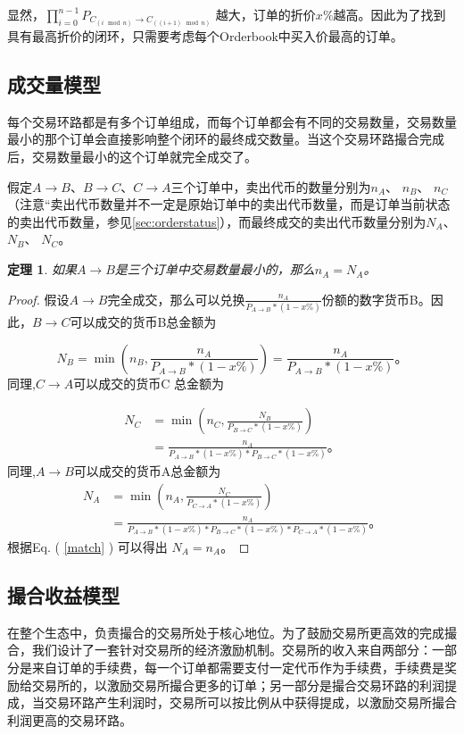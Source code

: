 \documentclass[UTF8,nofonts]{ctexart}
\newtheorem{theorem}{定理}[section]
\newtheorem{proof}{证明} [section]
\begin{document}
显然，$\prod_{i=0}^{n-1} P_{C_{(i\mod n)} \rightarrow C_{((i+1)\mod n)}}$ 越大，订单的折价$x\%$越高。因此为了找到具有最高折价的闭环，只需要考虑每个Orderbook中买入价最高的订单。


\subsection{成交量模型}
每个交易环路都是有多个订单组成，而每个订单都会有不同的交易数量，交易数量最小的那个订单会直接影响整个闭环的最终成交数量。当这个交易环路撮合完成后，交易数量最小的这个订单就完全成交了。

假定$A \rightarrow B$、$B \rightarrow C$、$C \rightarrow A$三个订单中，卖出代币的数量分别为$n_{A}$、 $n_{B}$、 $n_{C}$（注意“卖出代币数量并不一定是原始订单中的卖出代币数量，而是订单当前状态的卖出代币数量，参见\ref{sec:orderstatus}），而最终成交的卖出代币数量分别为$N_{A}$、 $N_{B}$、 $N_{C}$。

\begin{theorem}
如果$A \rightarrow B$是三个订单中交易数量最小的，那么$n_{A} = N_{A}$。
\end{theorem}

\begin{proof}
假设$A \rightarrow B$完全成交，那么可以兑换$\frac{n_{A}}{P_{A \rightarrow B}*(1-x\%)}$份额的数字货币B。因此，$B \rightarrow C$可以成交的货币B总金额为

$$N_{B}=\min(n_{B},\frac{n_{A}}{P_{A \rightarrow B}*(1-x\%)})=\frac{n_{A}}{P_{A \rightarrow B}*(1-x\%)}\text{。}$$
同理,$C \rightarrow A$可以成交的货币C 总金额为

\[ \begin{split}
N_{C}&=\min(n_{C},\frac{N_{B}}{P_{B \rightarrow C}*(1-x\%)})\\
&=\frac{n_{A}}{P_{A \rightarrow B}*(1-x\%)*P_{B \rightarrow C}*(1-x\%)}\text{。}
\end{split} \]
同理,$A \rightarrow B$可以成交的货币A总金额为
\[ \begin{split}
N_{A}&=\min(n_{A},\frac{N_{C}}{P_{C \rightarrow A}*(1-x\%)})\\
&=\frac{n_{A}}{P_{A \rightarrow B}*(1-x\%)*P_{B \rightarrow C}*(1-x\%)*P_{C \rightarrow A}*(1-x\%)}\text{。}
\end{split} \]
根据Eq. ( \ref{match} ) 可以得出 $N_{A}=n_{A}$。
\end{proof}

\subsection{撮合收益模型}
在整个生态中，负责撮合的交易所处于核心地位。为了鼓励交易所更高效的完成撮合，我们设计了一套针对交易所的经济激励机制。交易所的收入来自两部分：一部分是来自订单的手续费，每一个订单都需要支付一定代币作为手续费，手续费是奖励给交易所的，以激励交易所撮合更多的订单；另一部分是撮合交易环路的利润提成，当交易环路产生利润时，交易所可以按比例从中获得提成，以激励交易所撮合利润更高的交易环路。
\end{document}
